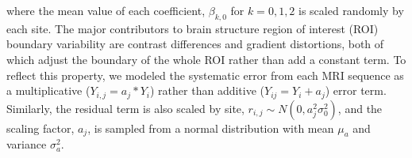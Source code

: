 where the mean value of each coefficient,
$\beta_{k,0}$ for  $k=0,1,2$ is scaled randomly by each site. The major contributors to brain structure region of interest (ROI) boundary variability are contrast differences and gradient distortions, both of which adjust the boundary of the whole ROI rather than add a constant term. To reflect this property, we modeled the systematic error from each MRI sequence as a multiplicative ($Y_{i,j} = a_j*Y_i$) rather than additive ($Y_{ij} = Y_i + a_j$) error term. Similarly, the residual term is also scaled by site, $r_{i,j} \sim N(0,a_j^2\sigma_0^2)$, and the scaling factor, $a_j$, is sampled from a normal distribution with mean $\mu_a$ and variance $\sigma_{a}^2$.